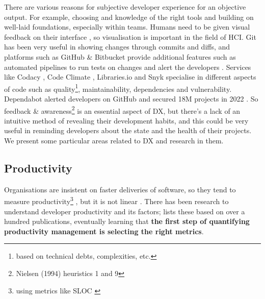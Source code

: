 \documentclass{prrcs}
\begin{document}
There are various reasons for subjective developer experience for an objective output. For example, choosing and knowledge of the right tools and building on well-laid foundations, especially within teams. Humans need to be given visual feedback on their interface \cite{liCategorisationVisualisationMethods2016}, so visualisation is important in the field of HCI. Git \cite{Git} has been very useful in showing changes through commits and diffs, and platforms such as GitHub \cite{GitHubLetBuild} \& Bitbucket \cite{BitbucketGitSolution} provide additional features such as automated pipelines to run tests on changes and alert the developers \cite{FeaturesGitHubActionsa,GitLabCICD,atlassianBitbucketPipelinesContinuous}. Services like Codacy \cite{DevOpsIntelligencePlatforma}, Code Climate \cite{DataDrivenEngineeringIntelligence}, Libraries.io \cite{LibrariesOpenSourcea} and Snyk \cite{SnykDeveloperSecurity2020a} specialise in different aspects of code such as quality\footnote{based on technical debts, complexities, etc.}, maintainability, dependencies and vulnerability. Dependabot \cite{Dependabot} alerted developers on GitHub and secured 18M projects in 2022 \cite{GlobalDeveloperCommunity}. So feedback \& awareness\footnote{Nielsen (1994) heuristics 1 and 9} is an essential aspect of DX, but there's a lack of an intuitive method of revealing their development habits, and this could be very useful in reminding developers about the state and the health of their projects. We present some particular areas related to DX and research in them.

\subsection*{Productivity}

Organisations are insistent on faster deliveries of software, so they tend to measure productivity\footnote{using metrics like SLOC \cite{careyImpactCommunicationMode1997,barry1981software,conteSoftwareEngineeringMetrics1986,jonesProgrammingProductivity1985}} \cite{devanbuAnalyticalEmpiricalEvaluation1996}, but it is not linear \cite{trendowiczChapterFactorsInfluencing2009,abdel-hamidSlipperyPathProductivity1996,briand2002software,kemererEmpiricalValidationSoftware1987}. There has been research to understand developer productivity and its factors; \textcite{trendowiczChapterFactorsInfluencing2009} lists these based on over a hundred publications, eventually learning that \textbf{the first step of quantifying productivity management is selecting the right metrics}.
\end{document}
